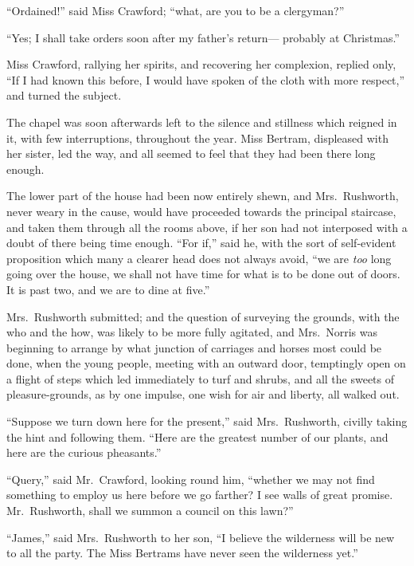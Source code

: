 \documentclass{article}
\begin{document}
``Ordained!'' said Miss Crawford; ``what, are you to be
a clergyman?''

``Yes; I shall take orders soon after my father's return---%
probably at Christmas.''

Miss Crawford, rallying her spirits, and recovering
her complexion, replied only, ``If I had known this before,
I would have spoken of the cloth with more respect,''
and turned the subject.

The chapel was soon afterwards left to the silence and stillness
which reigned in it, with few interruptions, throughout the year.
Miss Bertram, displeased with her sister, led the way,
and all seemed to feel that they had been there long enough.

The lower part of the house had been now entirely shewn,
and Mrs.\ Rushworth, never weary in the cause, would have
proceeded towards the principal staircase, and taken
them through all the rooms above, if her son had not
interposed with a doubt of there being time enough.
``For if,'' said he, with the sort of self-evident proposition
which many a clearer head does not always avoid, ``we are
\emph{too} long going over the house, we shall not have time
for what is to be done out of doors.  It is past two,
and we are to dine at five.''

Mrs.\ Rushworth submitted; and the question of surveying
the grounds, with the who and the how, was likely to be more
fully agitated, and Mrs.\ Norris was beginning to arrange
by what junction of carriages and horses most could be done,
when the young people, meeting with an outward door,
temptingly open on a flight of steps which led immediately
to turf and shrubs, and all the sweets of pleasure-grounds,
as by one impulse, one wish for air and liberty, all walked out.

``Suppose we turn down here for the present,'' said Mrs.\ Rushworth,
civilly taking the hint and following them.  ``Here are the
greatest number of our plants, and here are the curious pheasants.''

``Query,'' said Mr.\ Crawford, looking round him,
``whether we may not find something to employ us here
before we go farther?  I see walls of great promise.
Mr.\ Rushworth, shall we summon a council on this lawn?''

``James,'' said Mrs.\ Rushworth to her son, ``I believe
the wilderness will be new to all the party.  The Miss
Bertrams have never seen the wilderness yet.''
\end{document}
